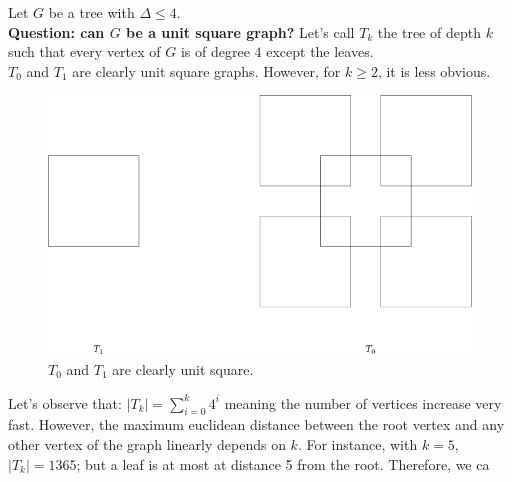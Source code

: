 \documentclass[12pt]{article}
\begin{document}
\theoremstyle{definition}
\newtheorem{definition}{Definition}[section]

\theoremstyle{remark}
\newtheorem*{remark}{Remark}
\newtheorem{theorem}{Theorem}[section]
\newtheorem{lemma}[theorem]{Lemma}

Let $G$ be a tree with $\Delta \le 4$.\\
\textbf{Question: can $G$ be a unit square graph?} 
Let's call $T_k$ the tree of depth $k$ such that every vertex of $G$ is of degree $4$ except the leaves. \\
$T_0$ and $T_1$ are clearly unit square graphs. However, for $k \ge 2$, it is less obvious. 

\begin{figure}[H]
    \centering
    \includegraphics[scale = 0.4]{any_tree.png}
    \caption{$T_0$ and $T_1$ are clearly unit square.}
\end{figure}

Let's observe that: $|T_k| = \sum_{i=0}^{k} 4^i$ meaning the number of vertices increase very fast. However, the maximum euclidean distance between the root vertex and any other vertex of the graph linearly depends on $k$.
For instance, with $k = 5$, $|T_k| = 1365$; but a leaf is at most at distance 5 from the root. Therefore, we ca 
\end{document}
